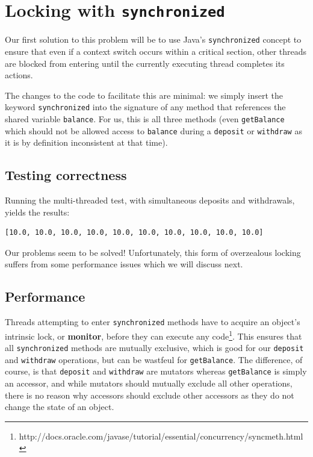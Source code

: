 \documentclass[a4paper,12pt]{kth-mag}
\begin{document}
\section{Locking with \texttt{synchronized}}

Our first solution to this problem will be to use Java's \texttt{synchronized} concept to ensure that even if a context switch occurs within a critical section, other threads are blocked from entering until the currently executing thread completes its actions.

The changes to the code to facilitate this are minimal: we simply insert the keyword \texttt{synchronized} into the signature of any method that references the shared variable \texttt{balance}. For us, this is all three methods (even \texttt{getBalance} which should not be allowed access to \texttt{balance} during a \texttt{deposit} or \texttt{withdraw} as it is by definition inconsistent at that time).

\subsection{Testing correctness}

Running the multi-threaded test, with simultaneous deposits and withdrawals, yields the results:

\begin{listing}[H]
	\begin{verbatim}
[10.0, 10.0, 10.0, 10.0, 10.0, 10.0, 10.0, 10.0, 10.0, 10.0] 
	\end{verbatim}
\end{listing}

Our problems seem to be solved! Unfortunately, this form of overzealous locking suffers from some performance issues which we will discuss next.

\subsection{Performance}

Threads attempting to enter \texttt{synchronized} methods have to acquire an object's intrinsic lock, or \textbf{monitor}, before they can execute any code\footnote{http://docs.oracle.com/javase/tutorial/essential/concurrency/syncmeth.html}. This ensures that all \texttt{synchronized} methods are mutually exclusive, which is good for our \texttt{deposit} and \texttt{withdraw} operations, but can be wastfeul for \texttt{getBalance}. The difference, of course, is that \texttt{deposit} and \texttt{withdraw} are mutators whereas \texttt{getBalance} is simply an accessor, and while mutators should mutually exclude all other operations, there is no reason why accessors should exclude other accessors as they do not change the state of an object. 
\end{document}
